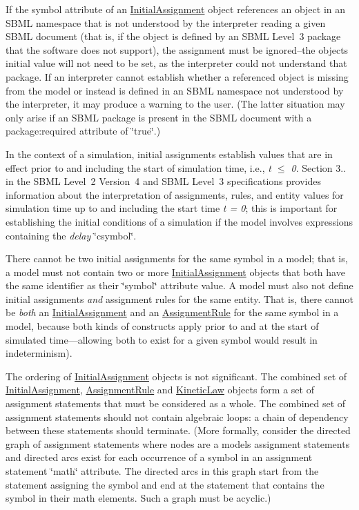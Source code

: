 If the symbol attribute of an \hyperlink{class_initial_assignment}{Initial\+Assignment} object references an object in an S\+B\+ML namespace that is not understood by the interpreter reading a given S\+B\+ML document (that is, if the object is defined by an S\+B\+ML Level~3 package that the software does not support), the assignment must be ignored--the object\textquotesingle{}s initial value will not need to be set, as the interpreter could not understand that package. If an interpreter cannot establish whether a referenced object is missing from the model or instead is defined in an S\+B\+ML namespace not understood by the interpreter, it may produce a warning to the user. (The latter situation may only arise if an S\+B\+ML package is present in the S\+B\+ML document with a package\+:required attribute of \char`\"{}true\char`\"{}.)

In the context of a simulation, initial assignments establish values that are in effect prior to and including the start of simulation time, i.\+e., {\itshape t $\leq$ 0}. Section 3.. in the S\+B\+ML Level~2 Version~4 and S\+B\+ML Level~3 specifications provides information about the interpretation of assignments, rules, and entity values for simulation time up to and including the start time {\itshape t = 0}; this is important for establishing the initial conditions of a simulation if the model involves expressions containing the {\itshape delay} \char`\"{}csymbol\char`\"{}.

There cannot be two initial assignments for the same symbol in a model; that is, a model must not contain two or more \hyperlink{class_initial_assignment}{Initial\+Assignment} objects that both have the same identifier as their \char`\"{}symbol\char`\"{} attribute value. A model must also not define initial assignments {\itshape and} assignment rules for the same entity. That is, there cannot be {\itshape both} an \hyperlink{class_initial_assignment}{Initial\+Assignment} and an \hyperlink{class_assignment_rule}{Assignment\+Rule} for the same symbol in a model, because both kinds of constructs apply prior to and at the start of simulated time---allowing both to exist for a given symbol would result in indeterminism).

The ordering of \hyperlink{class_initial_assignment}{Initial\+Assignment} objects is not significant. The combined set of \hyperlink{class_initial_assignment}{Initial\+Assignment}, \hyperlink{class_assignment_rule}{Assignment\+Rule} and \hyperlink{class_kinetic_law}{Kinetic\+Law} objects form a set of assignment statements that must be considered as a whole. The combined set of assignment statements should not contain algebraic loops\+: a chain of dependency between these statements should terminate. (More formally, consider the directed graph of assignment statements where nodes are a model\textquotesingle{}s assignment statements and directed arcs exist for each occurrence of a symbol in an assignment statement \char`\"{}math\char`\"{} attribute. The directed arcs in this graph start from the statement assigning the symbol and end at the statement that contains the symbol in their math elements. Such a graph must be acyclic.)

